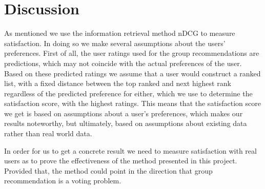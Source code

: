 \section{Discussion}\label{sec:conclusion_discussion}
As mentioned we use the information retrieval method nDCG to measure satisfaction. In doing so we make several assumptions about the users’ preferences. First of all, the user ratings used for the group recommendations are predictions, which may not coincide with the actual preferences of the user. Based on these predicted ratings we assume that a user would construct a ranked list, with a fixed distance between the top ranked and next highest rank regardless of the predicted preference for either, which we use to determine the satisfaction score, with the highest ratings. This means that the satisfaction score we get is based on assumptions about a user's preferences, which makes our results noteworthy, but ultimately, based on assumptions about existing data rather than real world data.

In order for us to get a concrete result we need to measure satisfaction with real users as to prove the effectiveness of the method presented in this project. Provided that, the method could point in the direction that group recommendation is a voting problem.